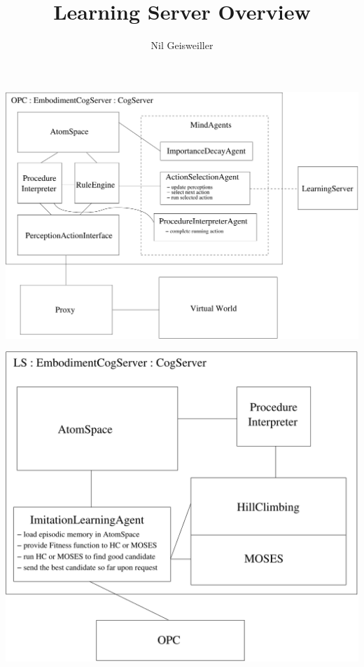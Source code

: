\documentclass{beamer}
\title{Learning Server Overview}
\author{Nil Geisweiller}
\begin{document}
\frame
{
  \maketitle
}

\frame
{
  \includegraphics[scale=0.4]{OPC.pdf}
}

\frame
{
  \includegraphics[scale=0.5]{LS.pdf}
}
\end{document}
